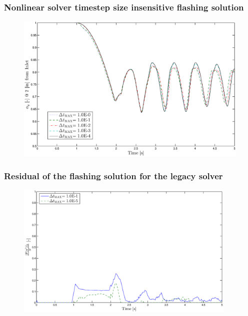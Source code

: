 \documentclass[compress,xcolor=table]{beamer}
\begin{document}
\begin{frame}
\frametitle{Nonlinear solver timestep size insensitive flashing solution}

\begin{figure}[h!t]
\centering
\includegraphics[width=.94\textwidth]{images/nl_flashing_1em0_1em1_2.eps}
\end{figure}

\end{frame}
\begin{frame}
\frametitle{Residual of the flashing solution for the legacy solver}

\begin{figure}[h!t]
\centering
\includegraphics[width=0.94\textwidth]{images/cobra_flashing_res_compare.eps}
\end{figure}

\end{frame}
\end{document}
